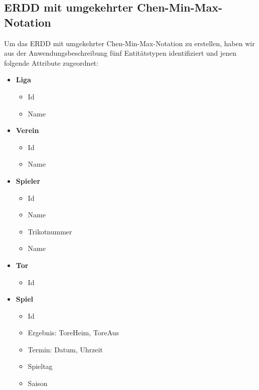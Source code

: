 \documentclass[
10pt,
a4paper
]{scrartcl}
\begin{document}
\subsection{ERDD mit umgekehrter Chen-Min-Max-Notation}

Um das ERDD mit umgekehrter Chen-Min-Max-Notation zu erstellen, haben wir aus der Anwendungsbeschreibung fünf Entitätstypen identifiziert und jenen folgende Attribute  zugeordnet:

 \begin{itemize}
  \item \textbf{Liga}
  \begin{itemize}  
     \item Id
      \item Name
   \end{itemize}

 \item\textbf{ Verein}
  \begin{itemize}  
     \item Id
      \item Name
   \end{itemize}

\item \textbf{Spieler}
  \begin{itemize}  
     \item Id
      \item Name
     \item Trikotnummer
      \item Name
   \end{itemize}

\item \textbf{Tor}
  \begin{itemize}  
     \item Id
   \end{itemize}

\item \textbf{Spiel}
  \begin{itemize}  
     \item Id
      \item Ergebnis: ToreHeim, ToreAus
     \item Termin: Datum, Uhrzeit
      \item Spieltag
    \item Saison
   \end{itemize}
 \end{itemize}
\end{document}
